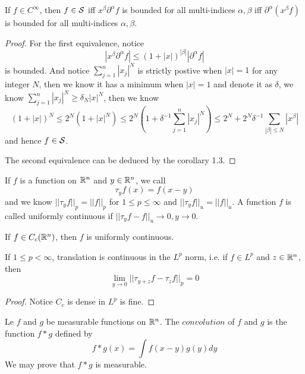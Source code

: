 \begin{proposition}
    If $f\in C^{\infty}$, then $f\in\mathcal{S}$ iff $x^{\beta}\partial^{\alpha} f$ is bounded for all multi-indices $\alpha,\beta$ iff $\partial^{\alpha}(x^{\beta}f)$ is bounded for all multi-indices $\alpha,\beta$.
\end{proposition}
\begin{proof}\par
    For the first equivalence, notice
    \[
    |x^{\beta}\partial^{\alpha} f| \leq (1+|x|)^{|\beta|}|\partial^{\alpha} f| 
    \]
    is bounded. And notice $\sum\limits_{j=1}^n |x_j|^N$ is strictly postive when $|x|=1$ for any integer $N$, then we know it has a minimum when $|x|=1$ and denote it as $\delta$, we know $\sum\limits_{j=1}^n |x_j|^N \ge \delta_N |x|^N$, then we know
    \[
    (1+|x|)^N \leq 2^N(1+|x|^N) \leq 2^N(1+\delta^{-1}\sum\limits_{j=1}^n |x_j|^N) \leq 2^N + 2^N\delta^{-1}\sum\limits_{|\beta|\leq N}|x^{\beta}|
    \]
    and hence $f\in\mathcal{S}$.\par
    The second equivalence can be deduced by the corollary 1.3.
\end{proof}

\begin{definition}
    If $f$ is a function on $\mathbb{R}^n$ and $y\in\mathbb{R}^n$, we call
    \[
    \tau_yf(x) = f(x-y)
    \] 
    and we know $||\tau_y f||_p = ||f||_p$ for $1\leq p \leq \infty$ and $||\tau_y f||_u = ||f||_u$. A function $f$ is called uniformly continuous if $||\tau_y f - f||_u \to 0, y\to 0$.
\end{definition}

\begin{lemma}
    If $f\in C_c(\mathbb{R}^n)$, then $f$ is uniformly continuous.
\end{lemma}

\begin{proposition}
    If $1\leq p < \infty$, translation is continuous in the $L^p$ norm, i.e. if $f\in L^p$ and $z\in\mathbb{R}^n$, then \[\lim_{y\to 0} ||\tau_{y+z}f-\tau_z f||_p = 0\]
\end{proposition}
\begin{proof}\par
    Notice $C_c$ is dense in $L^p$ is fine.
\end{proof}

\begin{definition}
    Le $f$ and $g$ be measurable functions on $\mathbb{R}^n$. The $convolution$ of $f$ and $g$ is the function $f*g$ defined by
    \[f*g(x) = \int f(x-y)g(y)dy\]
    We may prove that $f*g$ is measurable.
\end{definition}

